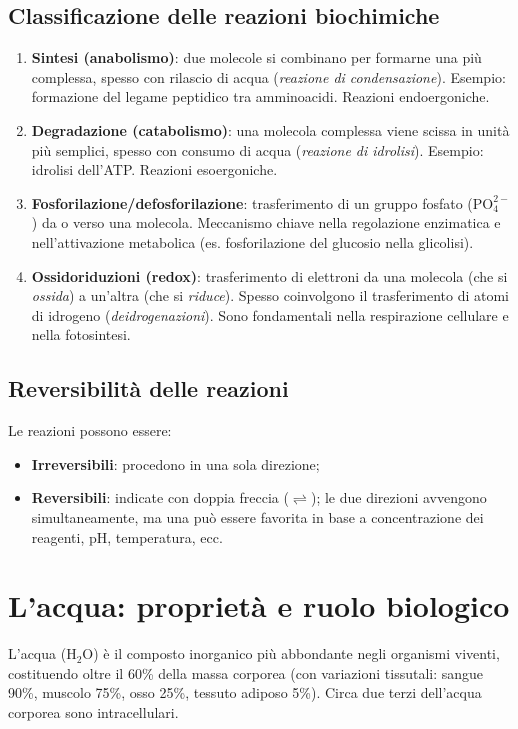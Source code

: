 \documentclass[12pt,a4paper]{report}
\begin{document}
\subsection{Classificazione delle reazioni biochimiche}
\begin{enumerate}
\item \textbf{Sintesi (anabolismo)}: due molecole si combinano per formarne una più complessa, spesso con rilascio di acqua (\textit{reazione di condensazione}). Esempio: formazione del legame peptidico tra amminoacidi. Reazioni endoergoniche.
\item \textbf{Degradazione (catabolismo)}: una molecola complessa viene scissa in unità più semplici, spesso con consumo di acqua (\textit{reazione di idrolisi}). Esempio: idrolisi dell'ATP. Reazioni esoergoniche.
\item \textbf{Fosforilazione/defosforilazione}: trasferimento di un gruppo fosfato (\(\mathrm{PO_4^{2-}}\)) da o verso una molecola. Meccanismo chiave nella regolazione enzimatica e nell'attivazione metabolica (es. fosforilazione del glucosio nella glicolisi).
\item \textbf{Ossidoriduzioni (redox)}: trasferimento di elettroni da una molecola (che si \textit{ossida}) a un'altra (che si \textit{riduce}). Spesso coinvolgono il trasferimento di atomi di idrogeno (\textit{deidrogenazioni}). Sono fondamentali nella respirazione cellulare e nella fotosintesi.
\end{enumerate}
\subsection{Reversibilità delle reazioni}
Le reazioni possono essere:
\begin{itemize}
\item \textbf{Irreversibili}: procedono in una sola direzione;
\item \textbf{Reversibili}: indicate con doppia freccia (\(\rightleftharpoons\)); le due direzioni avvengono simultaneamente, ma una può essere favorita in base a concentrazione dei reagenti, pH, temperatura, ecc.
\end{itemize}

\section{L'acqua: proprietà e ruolo biologico}
L'acqua (\(\mathrm{H_2O}\)) è il composto inorganico più abbondante negli organismi viventi, costituendo oltre il 60\% della massa corporea (con variazioni tissutali: sangue 90\%, muscolo 75\%, osso 25\%, tessuto adiposo 5\%). Circa due terzi dell'acqua corporea sono intracellulari.
\end{document}
